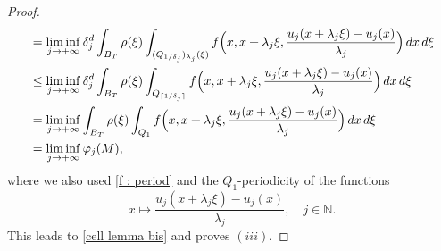 \documentclass[10pt,a4paper]{amsart}
\newcommand{\N}{\mathbb{N}}
\newcommand{\dej}{\delta_j}
\newcommand{\f}{\varphi}
\begin{document}
\begin{proof}
\begin{align*}
    & = \liminf_{j\to+\infty} \dej^d \int_{B_T} \rho(\xi)\int_{(Q_{1/\dej})_{\lambda_j}(\xi)} f\Bigl(x,x+\lambda_j\xi,\frac{u_j(x+\lambda_j\xi)-u_j(x)}{\lambda_j}\Bigr)\, dx\,d\xi \\
    & \leq \liminf_{j\to+\infty} \dej^d \int_{B_T} \rho(\xi)\int_{Q_{\lceil 1/\dej \rceil}} f\Bigl(x,x+\lambda_j\xi,\frac{u_j(x+\lambda_j\xi)-u_j(x)}{\lambda_j}\Bigr)\, dx\,d\xi \\
    & =  \liminf_{j\to+\infty} \int_{B_T} \rho(\xi)\int_{Q_1} f\Bigl(x,x+\lambda_j\xi,\frac{u_j(x+\lambda_j\xi)-u_j(x)}{\lambda_j}\Bigr)\, dx\,d\xi \\
    & = \liminf_{j\to+\infty}\f_j(M),
     \end{align*}
where we also used \eqref{f : period} and the $Q_1$-periodicity of the functions
\begin{equation*}
    x\mapsto \frac{u_j(x+\lambda_j\xi)-u_j(x)}{\lambda_j}, \quad j\in\N.
\end{equation*}
This leads to \eqref{cell lemma bis} and proves $(iii)$.
\end{proof}
\end{document}
